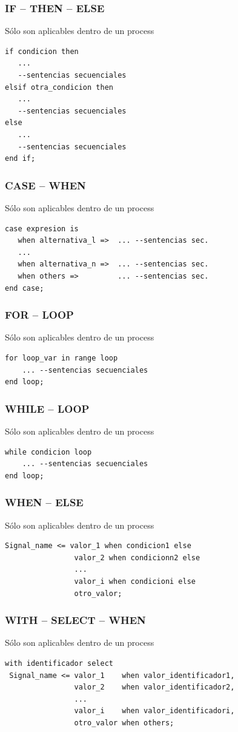 \subsubsection{IF – THEN – ELSE}
Sólo son aplicables dentro de un process
\begin{lstlisting}[style=vhdl]
if condicion then
   ...
   --sentencias secuenciales
elsif otra_condicion then
   ...
   --sentencias secuenciales
else
   ...
   --sentencias secuenciales
end if;
\end{lstlisting}

\subsubsection{CASE – WHEN} 
Sólo son aplicables dentro de un process
\begin{lstlisting}[style=vhdl]
case expresion is
   when alternativa_l =>  ... --sentencias sec.
   ...
   when alternativa_n =>  ... --sentencias sec.
   when others =>         ... --sentencias sec.
end case;
\end{lstlisting}

\subsubsection{FOR – LOOP}
Sólo son aplicables dentro de un process
\begin{lstlisting}[style=vhdl]
for loop_var in range loop
    ... --sentencias secuenciales
end loop; 
\end{lstlisting}

\subsubsection{WHILE – LOOP}
Sólo son aplicables dentro de un process
\begin{lstlisting}[style=vhdl]
 while condicion loop
    ... --sentencias secuenciales
end loop;
\end{lstlisting}

\subsubsection{WHEN – ELSE}
Sólo son aplicables dentro de un process
\begin{lstlisting}[style=vhdl]
 Signal_name <= valor_1 when condicion1 else
                valor_2 when condicionn2 else
                ...
                valor_i when condicioni else
                otro_valor;
\end{lstlisting}

\subsubsection{WITH – SELECT – WHEN}
Sólo son aplicables dentro de un process
\begin{lstlisting}[style=vhdl]
 with identificador select
 Signal_name <= valor_1    when valor_identificador1,
                valor_2    when valor_identificador2,
                ...
                valor_i    when valor_identificadori,
                otro_valor when others;

\end{lstlisting}

